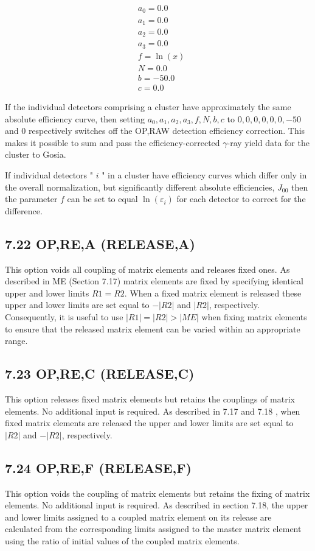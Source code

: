 \documentclass[10pt]{article}
\begin{document}
$$
\begin{aligned}
& a_{0}=0.0 \\
& a_{1}=0.0 \\
& a_{2}=0.0 \\
& a_{3}=0.0 \\
& f=\ln (x) \\
& N=0.0 \\
& b=-50.0 \\
& c=0.0
\end{aligned}
$$

If the individual detectors comprising a cluster have approximately the same absolute efficiency curve, then setting $a_{0}, a_{1}, a_{2}, a_{3}, f, N, b, c$ to $0,0,0,0,0,0,-50$ and 0 respectively switches off the OP,RAW detection efficiency correction. This makes it possible to sum and pass the efficiency-corrected $\gamma$-ray yield data for the cluster to Gosia.

If individual detectors " $i$ " in a cluster have efficiency curves which differ only in the overall normalization, but significantly different absolute efficiencies, $J_{00}$ then the parameter $f$ can be set to equal $\ln \left(\varepsilon_{i}\right)$ for each detector to correct for the difference.

\subsection*{7.22 OP,RE,A (RELEASE,A)}
This option voids all coupling of matrix elements and releases fixed ones. As described in ME (Section 7.17) matrix elements are fixed by specifying identical upper and lower limits $R 1=R 2$. When a fixed matrix element is released these upper and lower limits are set equal to $-|R 2|$ and $|R 2|$, respectively. Consequently, it is useful to use $|R 1|=|R 2|>|M E|$ when fixing matrix elements to ensure that the released matrix element can be varied within an appropriate range.

\subsection*{7.23 OP,RE,C (RELEASE,C)}
This option releases fixed matrix elements but retains the couplings of matrix elements. No additional input is required. As described in 7.17 and 7.18 , when fixed matrix elements are released the upper and lower limits are set equal to $|R 2|$ and $-|R 2|$, respectively.

\subsection*{7.24 OP,RE,F (RELEASE,F)}
This option voids the coupling of matrix elements but retains the fixing of matrix elements. No additional input is required. As described in section 7.18, the upper and lower limits assigned to a coupled matrix element on its release are calculated from the corresponding limits assigned to the master matrix element using the ratio of initial values of the coupled matrix elements.
\end{document}
